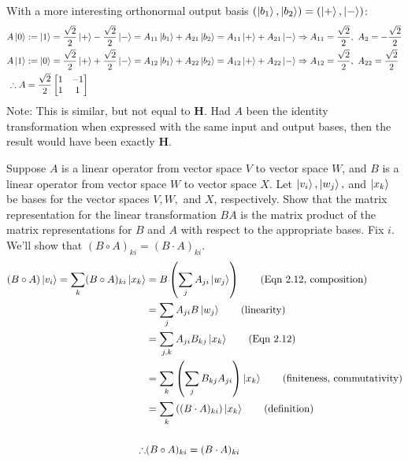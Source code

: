 With a more interesting orthonormal output basis $(\ket{b_1},\ket{b_2})=(\ket{+},\ket{-})$:
\begin{align*}
        A\ket{0} &:= \ket{1} = \frac{\sqrt{2}}{2}\ket{+}-\frac{\sqrt{2}}{2}\ket{-}= A_{11}\ket{b_1} + A_{21}\ket{b_2} = A_{11}\ket{+} + A_{21}\ket{-}\Rightarrow A_{11} = \frac{\sqrt{2}}{2},\ A_{2} = -\frac{\sqrt{2}}{2}\\
        A\ket{1} &:= \ket{0} = \frac{\sqrt{2}}{2}\ket{+}+\frac{\sqrt{2}}{2}\ket{-}= A_{12}\ket{b_1} + A_{22}\ket{b_2} = A_{12}\ket{+} + A_{22}\ket{-}\Rightarrow A_{12} = \frac{\sqrt{2}}{2},\ A_{22} = \frac{\sqrt{2}}{2}\\
    \therefore A &= \frac{\sqrt{2}}{2}
    \begin{bmatrix}
    1 & -1 \\
    1 & 1
    \end{bmatrix}
\end{align*}
Note: This is similar, but not equal to $\mathbf{H}$.  Had $A$ been the identity transformation when expressed with the
same input and output bases, then the result would have been exactly $\mathbf{H}$.

 Suppose $A$ is a linear operator from vector space $V$  to vector space $W$, and $B$ is a linear operator
from vector space $W$ to vector space $X$.  Let $\ket{v_i}, \ket{w_j},$ and $\ket{x_k}$ be bases for the vector spaces
$V, W,$ and $X$, respectively.  Show that the matrix representation for the linear transformation $BA$ is the matrix
product of the matrix representations for $B$ and $A$ with respect to the appropriate bases.
\Soln Fix $i$.  We'll show that $(B\circ A)_{ki} = (B \cdot A)_{ki}$.
\begin{align*}
(B\circ A) \ket{v_i} = \sum_k (B\circ A)_{ki} \ket{x_k} &= B \left( \sum_{j} A_{ji}\ket{w_j} \right) \tag{Eqn 2.12, composition}\\
	&= \sum_{j} A_{ji} B\ket{w_j}\tag{linearity}\\
	&= \sum_{j,k} A_{ji} B_{kj}\ket{x_k}\tag{Eqn 2.12}\\
	&= \sum_k \left( \sum_j B_{kj} A_{ji}  \right) \ket{x_k}\tag{finiteness, commutativity}\\
    &= \sum_k \left( (B\cdot A)_{ki}  \right) \ket{x_k}\tag{definition}\\\\
	\therefore & (B\circ A)_{ki} = (B\cdot A)_{ki}
\end{align*}

